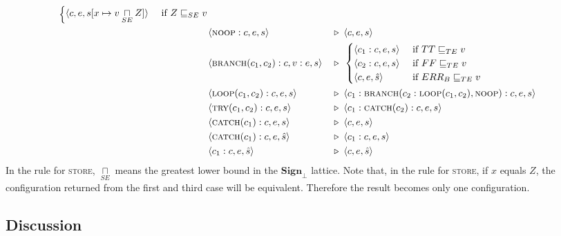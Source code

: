 \documentclass[11pt,oneside,a4paper]{article}
\newcommand{\AMIns}[1]{\textsc{#1}}
\newcommand{\AMConf}[3]{\langle #1, #2, #3 \rangle}
\newcommand{\AMArrow}{\: &\triangleright&\:\;}
\newcommand{\sign}{\textbf{Sign}_{\bot}}
\begin{document}
\begin{align*}
\begin{cases}
    \AMConf{c}{e}{s[x \mapsto v \underset{SE}{\sqcap} Z]} & 
    \text{ if } Z \sqsubseteq_{SE} v \\
 \end{cases}& \\
&\AMConf{\AMIns{noop}:c}{e}{s} \AMArrow 
 \AMConf{c}{e}{s} \\
&\AMConf{\AMIns{branch}(c_1,c_2):c}{v:e}{s} \AMArrow
 \begin{cases}
    \AMConf{c_1:c}{e}{s} & \text{ if } TT \sqsubseteq_{TE} v \\
    \AMConf{c_2:c}{e}{s} & \text{ if } FF \sqsubseteq_{TE} v \\
    \AMConf{c}{e}{\hat{s}} & \text{ if } ERR_B \sqsubseteq_{TE} v \\
 \end{cases}& \\
&\AMConf{\AMIns{loop}(c_1,c_2):c}{e}{s} \AMArrow 
 \AMConf{c_1:\AMIns{branch}(c_2:\AMIns{loop}(c_1, c_2), \AMIns{noop}):c}{e}{s}\\
&\AMConf{\AMIns{try}(c_1, c_2):c}{e}{s} \AMArrow
 \AMConf{c_1:\AMIns{catch}(c_2):c}{e}{s}& \\
&\AMConf{\AMIns{catch}(c_1):c}{e}{s} \AMArrow
 \AMConf{c}{e}{s}& \\
&\AMConf{\AMIns{catch}(c_1):c}{e}{\hat{s}} \AMArrow
 \AMConf{c_1:c}{e}{s}& \\
&\AMConf{c_1:c}{e}{\hat{s}} \AMArrow \AMConf{c}{e}{\hat{s}}
\end{align*}
In the rule for \textsc{store}, \(\underset{SE}{\sqcap}\) means the greatest 
lower bound in the \(\sign\) lattice.
Note that, in the rule for \textsc{store}, if \(x\) equals \(Z\), the 
configuration returned from the first and third case will be equivalent.
Therefore the result becomes only one configuration. 

\subsection*{Discussion}
\end{document}
